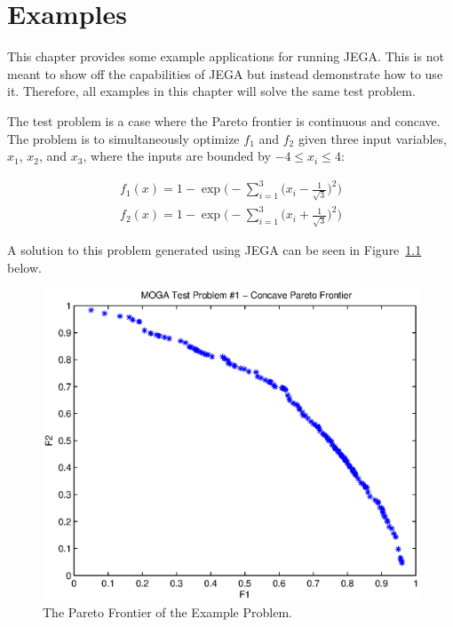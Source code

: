 \chapter{Examples} \label{ch:examples}
This chapter provides some example applications for running JEGA.
This is not meant to show off the capabilities of JEGA but instead
demonstrate how to use it.  Therefore, all examples in this chapter
will solve the same test problem.

The test problem is a case where the Pareto frontier is continuous
and concave. The problem is to simultaneously optimize $f_1$ and
$f_2$ given three input variables, $x_1$, $x_2$, and $x_3$, where
the inputs are bounded by $-4 \leq x_{i} \leq 4$:

\begin{eqnarray*}
f_1(x)=1-\exp\Bigg(-\sum_{i=1}^3 \bigg(x_{i}-\frac{1}{\sqrt{3}}\bigg)^2\Bigg) \\
f_2(x)=1-\exp\Bigg(-\sum_{i=1}^3
\bigg(x_{i}+\frac{1}{\sqrt{3}}\bigg)^2\Bigg)
\end{eqnarray*}

A solution to this problem generated using JEGA can be seen in
Figure~\ref{fig:mogatest1_pareto_front} below.

\begin{figure}[!ht]
    \centering
    \includegraphics[scale=0.45]{../../images/mogatest1_pareto_front.eps}
    \caption{The Pareto Frontier of the Example Problem.}
    \label{fig:mogatest1_pareto_front}
\end{figure}

